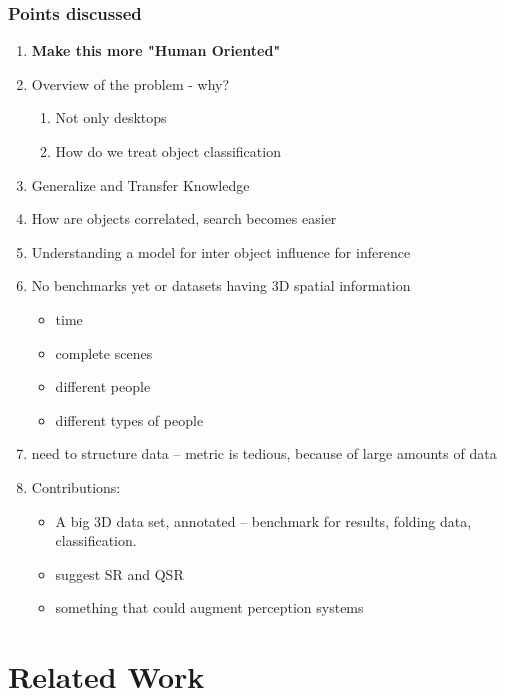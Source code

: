 \documentclass[letterpaper, 10 pt, conference]{ieeeconf}  %
\begin{document}
\subsubsection*{Points discussed}
\begin{enumerate}
	\item \textbf{Make this more "Human Oriented"}
	\item Overview of the problem - why?
	\begin{enumerate}
		\item Not only desktops
		\item How do we treat object classification
	\end{enumerate}
	\item Generalize and Transfer Knowledge
	\item How are objects correlated, search becomes easier
	\item Understanding a model for inter object influence for inference
	\item No benchmarks yet or datasets having 3D spatial information
	\begin{itemize}
		\item time
		\item complete scenes
		\item different people
		\item different types of people
	\end{itemize}
	\item need to structure data -- metric is tedious, because of large amounts of data
	\item Contributions:
	\begin{itemize}
		\item A big 3D data set, annotated -- benchmark for results, folding data, classification.
		\item suggest SR and QSR
		\item something that could augment perception systems
	\end{itemize}
\end{enumerate}


\section{Related Work}
\label{sec:Related Work}
\end{document}
